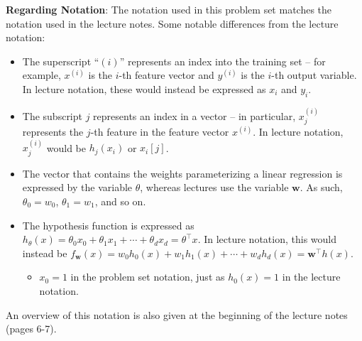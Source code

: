 \textbf{Regarding Notation}: The notation used in this problem set matches the notation used in the lecture notes. Some notable differences from the lecture notation:

\begin{itemize}
    \item The superscript ``$(i)$'' represents an index into the training set – for example, $x^{(i)}$ is the $i$-th feature vector and $y^{(i)}$ is the $i$-th output variable. In lecture notation, these would instead be expressed as $x_i$ and $y_i$.
    
    \item The subscript $j$ represents an index in a vector – in particular, $x_j^{(i)}$ represents the $j$-th feature in the feature vector $x^{(i)}$. In lecture notation, $x_j^{(i)}$ would be $h_j(x_i)$ or $x_i[j]$.
    
    \item The vector that contains the weights parameterizing a linear regression is expressed by the variable $\theta$, whereas lectures use the variable $\mathbf{w}$. As such, $\theta_0 = w_0$, $\theta_1 = w_1$, and so on.
    
    \item The hypothesis function is expressed as $h_\theta(x) = \theta_0 x_0 + \theta_1 x_1 + \cdots + \theta_d x_d = \theta^\top x$. In lecture notation, this would instead be $f_\mathbf{w}(x) = w_0 h_0(x) + w_1 h_1(x) + \cdots + w_d h_d(x) = \mathbf{w}^\top h(x)$.
    
    \begin{itemize}
        \item $x_0 = 1$ in the problem set notation, just as $h_0(x) = 1$ in the lecture notation.
    \end{itemize}
\end{itemize}

An overview of this notation is also given at the beginning of the lecture notes (pages 6-7).
